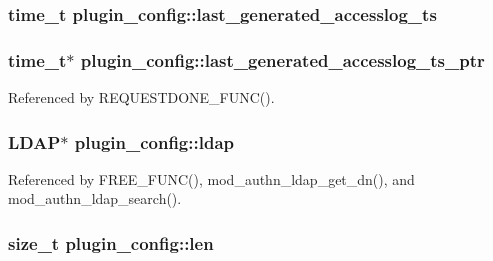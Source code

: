 \hypertarget{structplugin__config_ae3bcf96bb33e24cd8757fc9a4c90825b}{
\subsubsection[{last\-\_\-generated\-\_\-accesslog\-\_\-ts}]{\setlength{\rightskip}{0pt plus 5cm}time\-\_\-t plugin\-\_\-config\-::last\-\_\-generated\-\_\-accesslog\-\_\-ts}}\label{structplugin__config_ae3bcf96bb33e24cd8757fc9a4c90825b}
\hypertarget{structplugin__config_ad23655083ebea6a8d9f9a21c9827c7e7}{
\subsubsection[{last\-\_\-generated\-\_\-accesslog\-\_\-ts\-\_\-ptr}]{\setlength{\rightskip}{0pt plus 5cm}time\-\_\-t$\ast$ plugin\-\_\-config\-::last\-\_\-generated\-\_\-accesslog\-\_\-ts\-\_\-ptr}}\label{structplugin__config_ad23655083ebea6a8d9f9a21c9827c7e7}


Referenced by R\-E\-Q\-U\-E\-S\-T\-D\-O\-N\-E\-\_\-\-F\-U\-N\-C().

\hypertarget{structplugin__config_aa5819e1b912413153b89a06e14da0f00}{
\subsubsection[{ldap}]{\setlength{\rightskip}{0pt plus 5cm}L\-D\-A\-P$\ast$ plugin\-\_\-config\-::ldap}}\label{structplugin__config_aa5819e1b912413153b89a06e14da0f00}


Referenced by F\-R\-E\-E\-\_\-\-F\-U\-N\-C(), mod\-\_\-authn\-\_\-ldap\-\_\-get\-\_\-dn(), and mod\-\_\-authn\-\_\-ldap\-\_\-search().

\hypertarget{structplugin__config_a99f095cf4d13dc80a2f684ef20b4195d}{
\subsubsection[{len}]{\setlength{\rightskip}{0pt plus 5cm}size\-\_\-t plugin\-\_\-config\-::len}}\label{structplugin__config_a99f095cf4d13dc80a2f684ef20b4195d}


